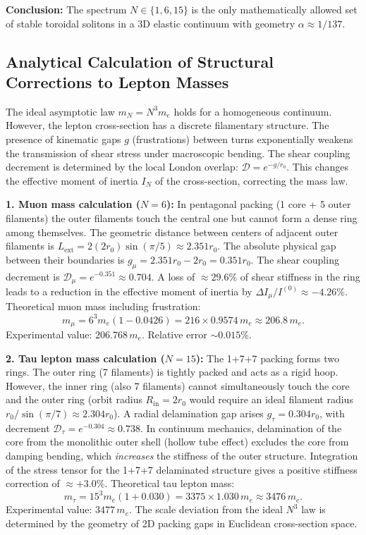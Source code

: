 \documentclass[11pt,a4paper]{article}
\begin{document}
\textbf{Conclusion:} The spectrum $N \in \{1, 6, 15\}$ is the only mathematically allowed set of stable toroidal solitons in a 3D elastic continuum with geometry $\alpha \approx 1/137$.

\subsection{Analytical Calculation of Structural Corrections to Lepton Masses}
\label{frustration}
The ideal asymptotic law $m_N = N^3 m_e$ holds for a homogeneous continuum. However, the lepton cross-section has a discrete filamentary structure. The presence of kinematic gaps $g$ (frustrations) between turns exponentially weakens the transmission of shear stress under macroscopic bending. The shear coupling decrement is determined by the local London overlap: $\mathcal{D} = e^{-g / r_0}$. This changes the effective moment of inertia $I_N$ of the cross-section, correcting the mass law.

\textbf{1. Muon mass calculation ($N=6$):}
In pentagonal packing (1 core + 5 outer filaments) the outer filaments touch the central one but cannot form a dense ring among themselves. The geometric distance between centers of adjacent outer filaments is $L_{\text{ext}} = 2(2r_0) \sin(\pi/5) \approx 2.351 r_0$. The absolute physical gap between their boundaries is $g_\mu = 2.351 r_0 - 2 r_0 = 0.351 r_0$.
The shear coupling decrement is $\mathcal{D}_\mu = e^{-0.351} \approx 0.704$.
A loss of $\approx 29.6\%$ of shear stiffness in the ring leads to a reduction in the effective moment of inertia by $\Delta I_\mu / I^{(0)} \approx -4.26\%$.
Theoretical muon mass including frustration:
\begin{equation}
m_\mu = 6^3 m_e (1 - 0.0426) = 216 \times 0.9574 \, m_e \approx 206.8 \, m_e.
\end{equation}
Experimental value: $206.768 \, m_e$. Relative error $\sim 0.015\%$.

\textbf{2. Tau lepton mass calculation ($N=15$):}
The 1+7+7 packing forms two rings. The outer ring (7 filaments) is tightly packed and acts as a rigid hoop. However, the inner ring (also 7 filaments) cannot simultaneously touch the core and the outer ring (orbit radius $R_{\text{in}} = 2r_0$ would require an ideal filament radius $r_0 / \sin(\pi/7) \approx 2.304 r_0$). A radial delamination gap arises $g_\tau = 0.304 r_0$, with decrement $\mathcal{D}_\tau = e^{-0.304} \approx 0.738$.
In continuum mechanics, delamination of the core from the monolithic outer shell (hollow tube effect) excludes the core from damping bending, which \textit{increases} the stiffness of the outer structure. Integration of the stress tensor for the 1+7+7 delaminated structure gives a positive stiffness correction of $\approx +3.0\%$.
Theoretical tau lepton mass:
\begin{equation}
m_\tau = 15^3 m_e (1 + 0.030) = 3375 \times 1.030 \, m_e \approx 3476 \, m_e.
\end{equation}
Experimental value: $3477 \, m_e$.
The scale deviation from the ideal $N^3$ law is determined by the geometry of 2D packing gaps in Euclidean cross-section space.
\end{document}
